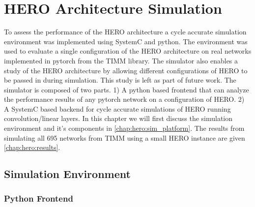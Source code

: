 \chapter{HERO Architecture Simulation}
\label{chap:results}

To assess the performance of the HERO architecture a cycle accurate simulation
environment was implemented using SystemC and python. The environment was used
to evaluate a single configuration of the HERO architecture on real networks implemented
in pytorch from the TIMM library. The simulator also enables a study of the HERO
architecture by allowing different configurations of HERO to be passed in during
simulation. This study is left as part of future work. The simulator is composed
of two parts. 1) A python based frontend that can analyze the performance
results of any pytorch network on a configuration of HERO. 2) A SystemC based
backend for cycle accurate simulations of HERO running convolution/linear layers. In
this chapter we will first discuss the simulation environment and it's
components in \autoref{chap:hero:sim_platform}. The results from simulating all
695 networks from TIMM using a small HERO instance are given
\autoref{chap:hero:results}.

\section{Simulation Environment}
\label{chap:hero:sim_platform}

\subsection{Python Frontend}
\label{chap:hero:sim_platform:frontend}

